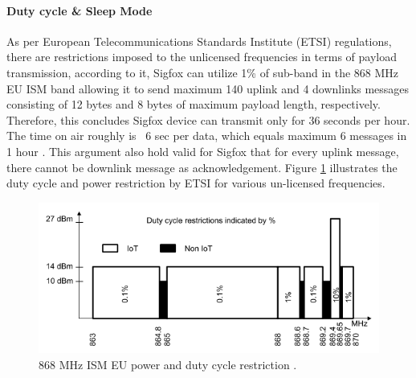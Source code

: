 \documentclass[12pt]{article}
\begin{document}
\paragraph{Duty cycle \& Sleep Mode}
As per European Telecommunications Standards Institute (ETSI) regulations, there are restrictions imposed to the unlicensed frequencies in terms of payload transmission, according to it, Sigfox can utilize 1\% of sub-band in the 868 MHz EU ISM band \cite{etsi2012electromagnetic} allowing it to send maximum 140 uplink and 4 downlinks messages consisting of 12 bytes and 8 bytes of maximum payload length, respectively. Therefore, this concludes Sigfox device can transmit only for 36 seconds per hour. The time on air roughly is ~6 sec per data, which equals maximum 6 messages in 1 hour \cite{vejlgaard2017coverage,SigfoxTechnicalDoc,securitysigfoxwhitepaper}. This argument also hold valid for Sigfox that for every uplink message, there cannot be downlink message as acknowledgement. Figure \ref{fig:ETSI duty Cycle and Power restriction} illustrates the duty cycle and power restriction by ETSI for various un-licensed frequencies.\par


\begin{figure}[H]
  \includegraphics[width=\textwidth]{Images/duty_cycleLPWAN.png}
  \centering
  \caption{868 MHz ISM EU power and duty cycle restriction  \cite{etsi2012electromagnetic}.}
  \label{fig:ETSI duty Cycle and Power restriction}
\end{figure}
\end{document}
